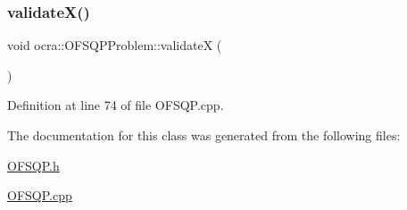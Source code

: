 \subsubsection{\texorpdfstring{validate\+X()}{validateX()}}
{\footnotesize\ttfamily void ocra\+::\+O\+F\+S\+Q\+P\+Problem\+::validateX (\begin{DoxyParamCaption}{ }\end{DoxyParamCaption})}



Definition at line 74 of file O\+F\+S\+Q\+P.\+cpp.



The documentation for this class was generated from the following files\+:\begin{DoxyCompactItemize}
\item 
\hyperlink{OFSQP_8h}{O\+F\+S\+Q\+P.\+h}\item 
\hyperlink{OFSQP_8cpp}{O\+F\+S\+Q\+P.\+cpp}\end{DoxyCompactItemize}

